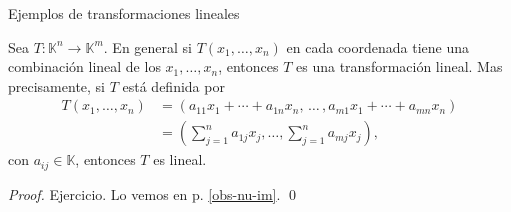 \documentclass[handout]{beamer} %
\newcommand{\K}{\mathbb K}
\begin{document}
\begin{frame}{Ejemplos de transformaciones lineales}




\end{frame}

\begin{frame}
    \begin{observacion}\label{obs-tl-1.5} 	Sea $T: \K^n \to \K^m$. En  general si $T(x_1,\ldots,x_n)$ en cada coordenada tiene una combinación lineal de los $x_1,\ldots,x_n$,  entonces $T$ es una transformación lineal. Mas precisamente, si $T$ está definida por
        \begin{align*}
        T(x_1,\ldots,x_n) &= (a_{11}x_1+\cdots + a_{1n}x_n,\, \ldots\,,a_{m1}x_1+\cdots + a_{mn}x_n )\\
        &=(\sum_{j=1}^n a_{1j} x_j,\ldots,\sum_{j=1}^n a_{mj} x_j),
        \end{align*}
        con $a_{ij} \in \K$, entonces $T$  es lineal. 
    \end{observacion}\pause
    \begin{proof} Ejercicio. \pause Lo  vemos  en  p. \ref{obs-nu-im}. \qed
    \end{proof}
\end{frame}
\end{document}
